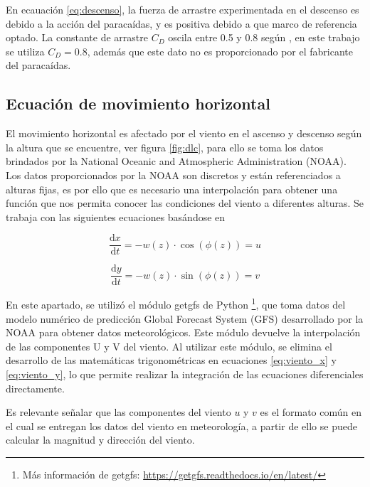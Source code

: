 En ecauación \ref{eq:descenso},  la fuerza de arrastre experimentada en el descenso es debido a la acción del paracaídas, y es positiva debido a que marco de referencia optado. La constante de arrastre $C_{D}$ oscila entre 0.5  y  0.8 según \cite{Constatntes_CD_HAB}, en este trabajo se utiliza $C_{D} = 0.8$, además que este dato no es proporcionado por el fabricante del paracaídas. 

\subsection{Ecuación de movimiento horizontal}

El movimiento horizontal es afectado por el viento  en el ascenso y descenso según la altura que se encuentre, ver figura \ref{fig:dlc}, para ello se toma los datos brindados por la National Oceanic and Atmospheric Administration (NOAA). Los datos proporcionados por la NOAA son discretos y están referenciados a alturas fijas, es por ello que es necesario una interpolación para obtener una función que nos permita conocer las condiciones del viento a diferentes alturas. Se trabaja con las siguientes ecuaciones basándose en \cite{lsoda}

\begin{equation}
    \label{eq:viento_x}
    \frac{\mathrm{d} x }{\mathrm{d} t} = - w(z) \cdot  \cos(\phi(z)) = u
\end{equation}

\begin{equation}
    \label{eq:viento_y}
    \frac{\mathrm{d} y }{\mathrm{d} t} = - w(z) \cdot \sin(\phi(z)) = v
\end{equation}

En este apartado, se utilizó el módulo getgfs  de Python \footnote{Más información de getgfs: \url{https://getgfs.readthedocs.io/en/latest/}}, que toma datos del modelo numérico de predicción Global Forecast System (GFS) desarrollado por la NOAA para obtener datos meteorológicos. Este módulo devuelve la interpolación de las componentes  U y V del viento. Al utilizar este módulo,  se elimina el desarrollo de las matemáticas trigonométricas en ecuaciones \ref{eq:viento_x} y \ref{eq:viento_y}, lo que permite realizar la integración de las ecuaciones diferenciales directamente.

Es relevante señalar que las componentes del viento $u$ y $v$ es el formato común en el cual se entregan  los datos del viento en meteorología\cite{lsoda}, a partir de ello se puede calcular la magnitud y dirección del viento. 
 
